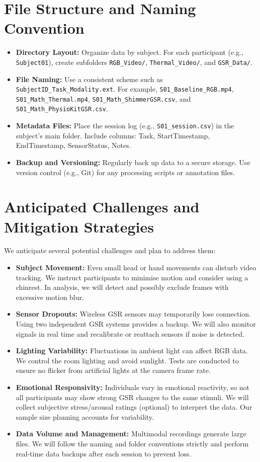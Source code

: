 \documentclass{article}
\begin{document}
\section{File Structure and Naming Convention}

\begin{itemize}
    \item \textbf{Directory Layout:} Organize data by subject. For each participant (e.g., \texttt{Subject01}), create subfolders \texttt{RGB\_Video/}, \texttt{Thermal\_Video/}, and \texttt{GSR\_Data/}.
    \item \textbf{File Naming:} Use a consistent scheme such as \texttt{SubjectID\_Task\_Modality.ext}. For example, \texttt{S01\_Baseline\_RGB.mp4}, \texttt{S01\_Math\_Thermal.mp4}, \texttt{S01\_Math\_ShimmerGSR.csv}, and \texttt{S01\_Math\_PhysioKitGSR.csv}.
    \item \textbf{Metadata Files:} Place the session log (e.g., \texttt{S01\_session.csv}) in the subject's main folder. Include columns: Task, StartTimestamp, EndTimestamp, SensorStatus, Notes.
    \item \textbf{Backup and Versioning:} Regularly back up data to a secure storage. Use version control (e.g., Git) for any processing scripts or annotation files.
\end{itemize}

\section{Anticipated Challenges and Mitigation Strategies}

We anticipate several potential challenges and plan to address them:

\begin{itemize}
    \item \textbf{Subject Movement:} Even small head or hand movements can disturb video tracking. We instruct participants to minimise motion and consider using a chinrest. In analysis, we will detect and possibly exclude frames with excessive motion blur.
    \item \textbf{Sensor Dropouts:} Wireless GSR sensors may temporarily lose connection. Using two independent GSR systems provides a backup. We will also monitor signals in real time and recalibrate or reattach sensors if noise is detected.
    \item \textbf{Lighting Variability:} Fluctuations in ambient light can affect RGB data. We control the room lighting and avoid sunlight. Tests are conducted to ensure no flicker from artificial lights at the camera frame rate.
    \item \textbf{Emotional Responsivity:} Individuals vary in emotional reactivity, so not all participants may show strong GSR changes to the same stimuli. We will collect subjective stress/arousal ratings (optional) to interpret the data. Our sample size planning accounts for variability.
    \item \textbf{Data Volume and Management:} Multimodal recordings generate large files. We will follow the naming and folder conventions strictly and perform real-time data backups after each session to prevent loss.
\end{itemize}
\end{document}
